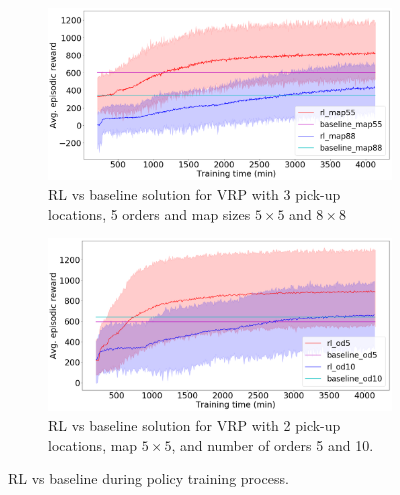 \begin{figure}[h!]
	\centering
	\begin{subfigure}[b]{0.45\textwidth}
		\centering
		\includegraphics[width=1\linewidth]{vrp_images/vrp_mapsize.png}
		\caption{RL vs baseline solution for VRP with 3 pick-up locations, 5 orders and map sizes $5 \times 5$ and $8 \times 8$ }
		\label{fig:vrp_mapsize}
	\end{subfigure}
	\hspace{2em}
	\begin{subfigure}[b]{0.45\textwidth}
		\centering
		\includegraphics[width=1\linewidth]{vrp_images/vrp_ordernumber.png}
		\caption{RL vs baseline solution for VRP with 2 pick-up locations, map $5 \times 5$, and number of orders 5 and 10. }
		\label{fig:vrp_ordernumber}
	\end{subfigure}
\label{fig:vrp}
\caption{RL vs baseline during policy training process.}
	\vspace{-1em}
\end{figure}

